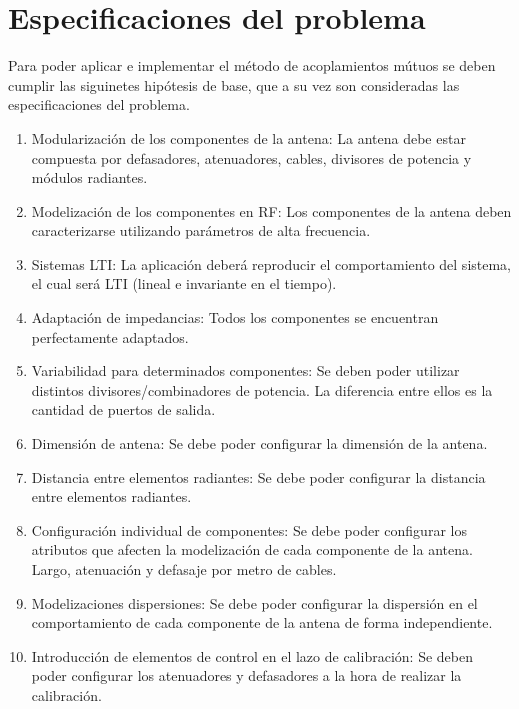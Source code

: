 \section{Especificaciones del problema} \label{sc:specifications}

Para poder aplicar e implementar el método de acoplamientos mútuos se deben cumplir las siguinetes hipótesis de base, que a su
vez son consideradas las especificaciones del problema.

\begin{enumerate}
    \item Modularización de los componentes de la antena: La antena debe estar compuesta por defasadores, atenuadores, cables,
		divisores de potencia y módulos radiantes.

	\item Modelización de los componentes en RF: Los componentes de la antena deben caracterizarse utilizando parámetros de alta
		frecuencia.

    \item Sistemas LTI: La aplicación deberá reproducir el comportamiento del sistema, el cual será LTI (lineal e invariante
		en el tiempo).

	\item Adaptación de impedancias: Todos los componentes se encuentran perfectamente adaptados.

    \item Variabilidad para determinados componentes: Se deben poder utilizar distintos divisores/combinadores de potencia.
		La diferencia entre ellos es la cantidad de puertos de salida.

    \item Dimensión de antena: Se debe poder configurar la dimensión de la antena.
    \item Distancia entre elementos radiantes: Se debe poder configurar la distancia entre elementos radiantes.
    \item Configuración individual de componentes: Se debe poder configurar los atributos que afecten la modelización de cada
		componente de la antena. Largo, atenuación y defasaje por metro de cables.

    \item Modelizaciones dispersiones: Se debe poder configurar la dispersión en el comportamiento de cada componente de la
		antena de forma independiente.

    \item Introducción de elementos de control en el lazo de calibración: Se deben poder configurar los atenuadores y
		defasadores a la hora de realizar la calibración.


\end{enumerate}
